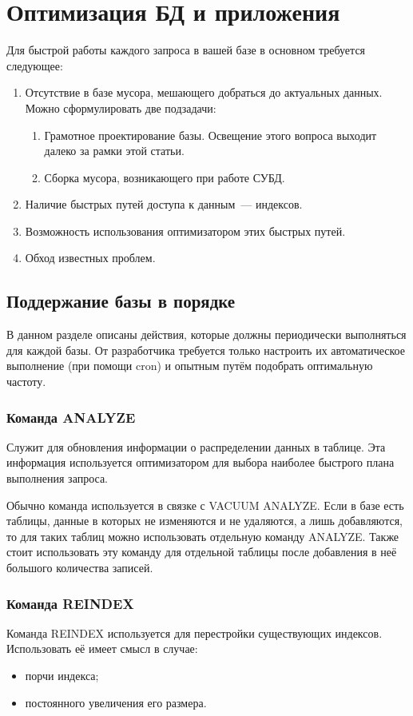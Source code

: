 \section{Оптимизация БД и приложения}
Для быстрой работы каждого запроса в вашей базе в основном требуется следующее:
\begin{enumerate}
 \item Отсутствие в базе мусора, мешающего добраться до актуальных данных. Можно сформулировать две подзадачи:
 \begin{enumerate}
  \item Грамотное проектирование базы. Освещение этого вопроса выходит далеко за рамки этой статьи.
  \item Сборка мусора, возникающего при работе СУБД.
 \end{enumerate}
 \item Наличие быстрых путей доступа к данным~--- индексов.
 \item Возможность использования оптимизатором этих быстрых путей.
 \item Обход известных проблем.
\end{enumerate}

\subsection{Поддержание базы в порядке}
В данном разделе описаны действия, которые должны периодически выполняться для каждой базы. От разработчика требуется только настроить 
их автоматическое выполнение (при помощи cron) и опытным путём подобрать оптимальную частоту.

\subsubsection{Команда ANALYZE}
Служит для обновления информации о распределении данных в таблице. Эта информация используется оптимизатором для выбора наиболее 
быстрого плана выполнения запроса.

Обычно команда используется в связке с VACUUM ANALYZE. Если в базе есть таблицы, данные в которых не изменяются и не удаляются, а лишь 
добавляются, то для таких таблиц можно использовать отдельную команду ANALYZE. Также стоит использовать эту команду для отдельной 
таблицы после добавления в неё большого количества записей.

\subsubsection{Команда REINDEX}
Команда REINDEX используется для перестройки существующих индексов.
Использовать её имеет смысл в случае:
\begin{itemize}
\item порчи индекса;
\item постоянного увеличения его размера.
\end{itemize}

